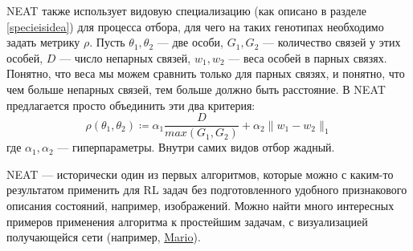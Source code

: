 \begin{example}
NEAT также использует видовую специализацию (как описано в разделе \ref{specieisidea}) для процесса отбора, для чего на таких генотипах необходимо задать метрику $\rho$. Пусть $\theta_1, \theta_2$ --- две особи, $G_1, G_2$ --- количество связей у этих особей, $D$ --- число непарных связей, $w_1, w_2$ --- веса особей в парных связях. Понятно, что веса мы можем сравнить только для парных связях, и понятно, что чем больше непарных связей, тем больше должно быть расстояние. В NEAT предлагается просто объединить эти два критерия: 
$$\rho(\theta_1, \theta_2) \coloneqq \alpha_1 \frac{D}{max(G_1, G_2)} + \alpha_2 \|w_1 - w_2\|_1$$
где $\alpha_1, \alpha_2$ --- гиперпараметры. Внутри самих видов отбор жадный.

NEAT --- исторически один из первых алгоритмов, которые можно с каким-то результатом применить для RL задач без подготовленного удобного признакового описания состояний, например, изображений. Можно найти много интересных примеров применения алгоритма к простейшим задачам, с визуализацией получающейся сети (например, \href{https://www.youtube.com/watch?v=qv6UVOQ0F44}{Mario}). 

\end{example}


